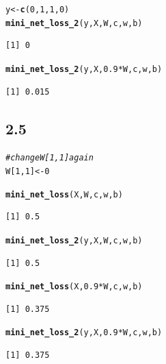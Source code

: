 \documentclass[10pt, a4paper, english]{article}\usepackage[]{graphicx}\usepackage[dvipsnames]{xcolor}
\makeatletter
\newcommand{\hlnum}[1]{\textcolor[rgb]{0.686,0.059,0.569}{#1}}%
\newcommand{\hlcom}[1]{\textcolor[rgb]{0.678,0.584,0.686}{\textit{#1}}}%
\newcommand{\hlopt}[1]{\textcolor[rgb]{0,0,0}{#1}}%
\newcommand{\hlstd}[1]{\textcolor[rgb]{0.345,0.345,0.345}{#1}}%
\newcommand{\hlkwb}[1]{\textcolor[rgb]{0.69,0.353,0.396}{#1}}%
\newcommand{\hlkwd}[1]{\textcolor[rgb]{0.737,0.353,0.396}{\textbf{#1}}}%
\newenvironment{kframe}{%
 \def\at@end@of@kframe{}%
 \ifinner\ifhmode%
  \def\at@end@of@kframe{\end{minipage}}%
  \begin{minipage}{\columnwidth}%
 \fi\fi%
 \def\FrameCommand##1{\hskip\@totalleftmargin \hskip-\fboxsep
 \colorbox{shadecolor}{##1}\hskip-\fboxsep
     \hskip-\linewidth \hskip-\@totalleftmargin \hskip\columnwidth}%
 \MakeFramed {\advance\hsize-\width
   \@totalleftmargin\z@ \linewidth\hsize
   \@setminipage}}%
 {\par\unskip\endMakeFramed%
 \at@end@of@kframe}
\newenvironment{knitrout}{}{} %
\makeatother
\begin{document}
\begin{knitrout}
\begin{kframe}
\begin{alltt}
\hlstd{y} \hlkwb{<-} \hlkwd{c}\hlstd{(}\hlnum{0}\hlstd{,} \hlnum{1}\hlstd{,} \hlnum{1}\hlstd{,} \hlnum{0}\hlstd{)}
\hlkwd{mini_net_loss_2}\hlstd{(y, X, W, c, w, b)}
\end{alltt}
\begin{verbatim}
[1] 0
\end{verbatim}
\begin{alltt}
\hlkwd{mini_net_loss_2}\hlstd{(y, X,} \hlnum{0.9}\hlopt{*}\hlstd{W, c, w, b)}
\end{alltt}
\begin{verbatim}
[1] 0.015
\end{verbatim}
\end{kframe}
\end{knitrout}

\subsection{2.5}
\begin{knitrout}
\color{fgcolor}\begin{kframe}
\begin{alltt}
\hlcom{#change W[1,1] again}
\hlstd{W[}\hlnum{1}\hlstd{,}\hlnum{1}\hlstd{]} \hlkwb{<-} \hlnum{0}

\hlkwd{mini_net_loss}\hlstd{(X, W, c, w, b)}
\end{alltt}
\begin{verbatim}
[1] 0.5
\end{verbatim}
\begin{alltt}
\hlkwd{mini_net_loss_2}\hlstd{(y, X, W, c, w, b)}
\end{alltt}
\begin{verbatim}
[1] 0.5
\end{verbatim}
\begin{alltt}
\hlkwd{mini_net_loss}\hlstd{(X,} \hlnum{0.9}\hlopt{*}\hlstd{W, c, w, b)}
\end{alltt}
\begin{verbatim}
[1] 0.375
\end{verbatim}
\begin{alltt}
\hlkwd{mini_net_loss_2}\hlstd{(y, X,} \hlnum{0.9}\hlopt{*}\hlstd{W, c, w, b)}
\end{alltt}
\begin{verbatim}
[1] 0.375
\end{verbatim}
\end{kframe}
\end{knitrout}
 
\end{document}
